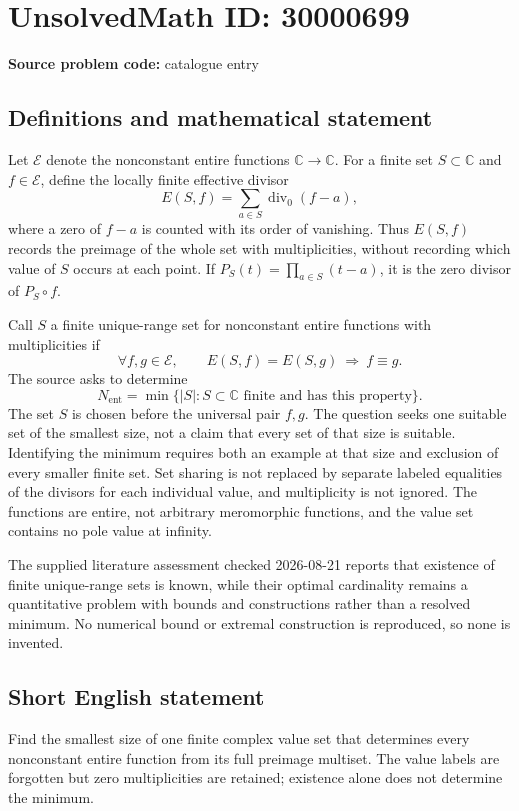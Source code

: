 \documentclass[11pt]{article}
\newcommand{\C}{\mathbb{C}}
\begin{document}
\section*{UnsolvedMath ID: 30000699}
\textbf{Source problem code:} catalogue entry
\subsection{Definitions and mathematical statement}
Let \(\mathcal E\) denote the nonconstant entire functions \(\C\to\C\). For a finite set \(S\subset\C\) and \(f\in\mathcal E\), define the locally finite effective divisor
\[
E(S,f)=\sum_{a\in S}\operatorname{div}_0(f-a),
\]
where a zero of \(f-a\) is counted with its order of vanishing. Thus \(E(S,f)\) records the preimage of the whole set with multiplicities, without recording which value of \(S\) occurs at each point. If \(P_S(t)=\prod_{a\in S}(t-a)\), it is the zero divisor of \(P_S\circ f\).

Call \(S\) a finite unique-range set for nonconstant entire functions with multiplicities if
\[
\forall f,g\in\mathcal E,\qquad
E(S,f)=E(S,g)\ \Longrightarrow\ f\equiv g.
\]
The source asks to determine
\[
N_{\mathrm{ent}}=\min\{|S|:S\subset\C\text{ finite and has this property}\}.
\]
The set \(S\) is chosen before the universal pair \(f,g\). The question seeks one suitable set of the smallest size, not a claim that every set of that size is suitable. Identifying the minimum requires both an example at that size and exclusion of every smaller finite set. Set sharing is not replaced by separate labeled equalities of the divisors for each individual value, and multiplicity is not ignored. The functions are entire, not arbitrary meromorphic functions, and the value set contains no pole value at infinity.

The supplied literature assessment checked 2026-08-21 reports that existence of finite unique-range sets is known, while their optimal cardinality remains a quantitative problem with bounds and constructions rather than a resolved minimum. No numerical bound or extremal construction is reproduced, so none is invented.
\subsection{Short English statement}
Find the smallest size of one finite complex value set that determines every nonconstant entire function from its full preimage multiset. The value labels are forgotten but zero multiplicities are retained; existence alone does not determine the minimum.
\end{document}

